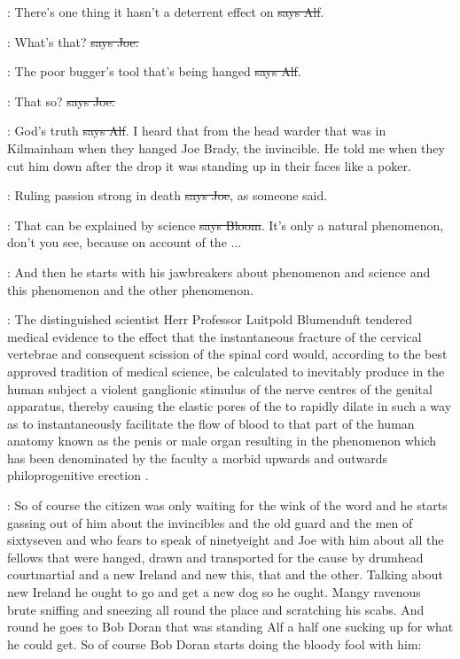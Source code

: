 \bergan:
There's one thing it hasn't a deterrent effect
on \sout{says Alf}.

\joe:
What's that? \sout{says Joe.}

\bergan:
The poor bugger's tool that's being hanged
\sout{says Alf}.

\joe:
That so? \sout{says Joe.}

\bergan:
God's truth \sout{says Alf}.
I heard that from the head warder that was in
Kilmainham when they hanged Joe Brady, the invincible. He told me when
they cut him down after the drop it was standing up in their faces like a
poker.

\joe:
Ruling passion strong in death \sout{says Joe},
as someone said.

\Bloom:
That can be explained by science \sout{says Bloom}.
It's only a natural
phenomenon, don't you see, because on account of the ...

\Nq:
And then he starts with his jawbreakers about phenomenon and
science and this phenomenon and the other phenomenon.

:
The distinguished scientist Herr Professor Luitpold Blumenduft
tendered medical evidence to the effect that the instantaneous fracture of
the cervical vertebrae and consequent scission of the spinal cord would,
according to the best approved tradition of medical science, be calculated
to inevitably produce in the human subject a violent ganglionic stimulus
of the nerve centres of the genital apparatus, thereby causing the elastic
pores of the  to rapidly dilate in such a way as to
instantaneously facilitate the flow of blood to that part of the human
anatomy known as the penis or male organ resulting in the phenomenon which
has been denominated by the faculty a morbid upwards and outwards
philoprogenitive erection .

\Nq:
So of course the citizen was only waiting for the wink of the word and
he starts gassing out of him about the invincibles and the old guard and
the men of sixtyseven and who fears to speak of ninetyeight and Joe with
him about all the fellows that were hanged, drawn and transported for the
cause by drumhead courtmartial and a new Ireland and new this, that and
the other. Talking about new Ireland he ought to go and get a new dog so
he ought. Mangy ravenous brute sniffing and sneezing all round the place
and scratching his scabs. And round he goes to Bob Doran that was
standing Alf a half one sucking up for what he could get. So of course Bob
Doran starts doing the bloody fool with him:

